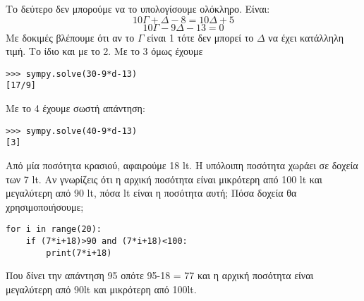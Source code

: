 Το δεύτερο δεν μπορούμε να το υπολογίσουμε ολόκληρο.
Είναι:
$$10\Gamma+\Delta-8 = 10\Delta + 5$$
$$10\Gamma-9\Delta-13=0$$
Με δοκιμές βλέπουμε ότι αν το $\Gamma$ είναι 1 τότε δεν μπορεί το $\Delta$ να έχει κατάλληλη τιμή. Το ίδιο και με το 2. Με το 3 όμως έχουμε 
\begin{lstlisting}
>>> sympy.solve(30-9*d-13)
[17/9]
\end{lstlisting}
Με το 4 έχουμε σωστή απάντηση:
\begin{lstlisting}
>>> sympy.solve(40-9*d-13)
[3]
\end{lstlisting}
\begin{exercise}
Από μία ποσότητα κρασιού, αφαιρούμε 18 lt. Η υπόλοιπη ποσότητα χωράει σε δοχεία
των 7 lt. Αν γνωρίζεις ότι η αρχική ποσότητα είναι μικρότερη από 100 lt και μεγαλύτερη
από 90 lt, πόσα lt είναι η ποσότητα αυτή; Πόσα δοχεία θα χρησιμοποιήσουμε;
\end{exercise}
\begin{lstlisting}
for i in range(20):
    if (7*i+18)>90 and (7*i+18)<100:
        print(7*i+18)
\end{lstlisting}
Που δίνει την απάντηση 95 οπότε 95-18 = 77 και η αρχική ποσότητα είναι μεγαλύτερη από 90lt και μικρότερη από 100lt.